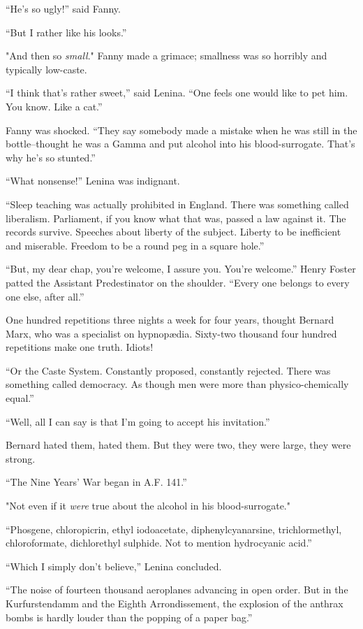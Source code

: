 \documentclass[12pt]{report}
\begin{document}
``He's so ugly!'' said Fanny.

``But I rather like his looks.''

"And then so \emph{small}." Fanny made a grimace; smallness was so
horribly and typically low-caste.

``I think that's rather sweet,'' said Lenina. ``One feels one would like
to pet him. You know. Like a cat.''

Fanny was shocked. ``They say somebody made a mistake when he was still
in the bottle--thought he was a Gamma and put alcohol into his
blood-surrogate. That's why he's so stunted.''

``What nonsense!'' Lenina was indignant.

``Sleep teaching was actually prohibited in England. There was something
called liberalism. Parliament, if you know what that was, passed a law
against it. The records survive. Speeches about liberty of the subject.
Liberty to be inefficient and miserable. Freedom to be a round peg in a
square hole.''

``But, my dear chap, you're welcome, I assure you. You're welcome.''
Henry Foster patted the Assistant Predestinator on the shoulder. ``Every
one belongs to every one else, after all.''

One hundred repetitions three nights a week for four years, thought
Bernard Marx, who was a specialist on hypnopædia. Sixty-two thousand
four hundred repetitions make one truth. Idiots!

``Or the Caste System. Constantly proposed, constantly rejected. There
was something called democracy. As though men were more than
physico-chemically equal.''

``Well, all I can say is that I'm going to accept his invitation.''

Bernard hated them, hated them. But they were two, they were large, they
were strong.

``The Nine Years' War began in A.F. 141.''

"Not even if it \emph{were} true about the alcohol in his
blood-surrogate."

``Phosgene, chloropicrin, ethyl iodoacetate, diphenylcyanarsine,
trichlormethyl, chloroformate, dichlorethyl sulphide. Not to mention
hydrocyanic acid.''

``Which I simply don't believe,'' Lenina concluded.

``The noise of fourteen thousand aeroplanes advancing in open order. But
in the Kurfurstendamm and the Eighth Arrondissement, the explosion of
the anthrax bombs is hardly louder than the popping of a paper bag.''
\end{document}
